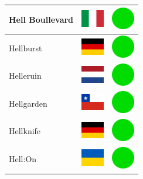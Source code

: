 \documentclass[12pt, a4paper, twoside]{report}
\begin{document}
\begin{center}
\begin{longtable}{|p{5cm}|p{2cm}|p{2cm}|}
 Hell Boullevard                                            & \includegraphics[width=1cm]{../img/flags/it} &   \includegraphics[width=1cm]{../likes/y} \\ \hline
 Hellburst                                                  & \includegraphics[width=1cm]{../img/flags/de} &   \includegraphics[width=1cm]{../likes/y} \\ \hline
 Helleruin                                                  & \includegraphics[width=1cm]{../img/flags/nl} &   \includegraphics[width=1cm]{../likes/y} \\ \hline
 Hellgarden                                                 & \includegraphics[width=1cm]{../img/flags/cl} &   \includegraphics[width=1cm]{../likes/y} \\ \hline
 Hellknife                                                  & \includegraphics[width=1cm]{../img/flags/de} &   \includegraphics[width=1cm]{../likes/y} \\ \hline
 Hell:On                                                    & \includegraphics[width=1cm]{../img/flags/ua} &   \includegraphics[width=1cm]{../likes/y} \\ \hline

\end{longtable}
\end{center}
\end{document}
